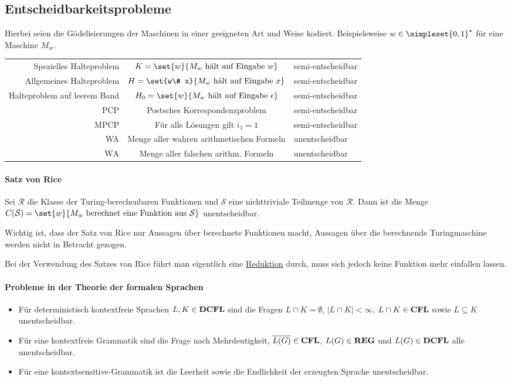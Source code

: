 \subsection{Entscheidbarkeitsprobleme}
Hierbei seien die Gödelisierungen der Maschinen in einer geeigneten Art und Weise kodiert. Beispielsweise $w\in\simpleset{0,1}^\star$ für eine Maschine $M_w$.
\medskip

\begin{tabular}{r|c|l}
	Spezielles Halteproblem & $K=\set{w}{M_w \text{ hält auf Eingabe } w}$ & semi-entscheidbar\\
	Allgemeines Halteproblem & $H=\set{w\# x}{M_w \text{ hält auf Eingabe } x}$ & semi-entscheidbar\\
	Halteproblem auf leerem Band & $H_0=\set{w}{M_w \text{ hält auf Eingabe } \epsilon}$ & semi-entscheidbar\\
	PCP & Postsches Korrespondenzproblem & semi-entscheidbar\\
	MPCP & Für alle Lösungen gilt $i_1=1$ & semi-entscheidbar\\
	WA & Menge aller wahren arithmetischen Formeln & unentscheidbar\\
	$\overline{\text{WA}}$ & Menge aller falschen arithm. Formeln & unentscheidbar
\end{tabular}

\paragraph{Satz von Rice}
Sei $\mathcal R$ die Klasse der Turing-berechenbaren Funktionen und $\mathcal S$ eine nichttriviale Teilmenge von $\mathcal R$.
Dann ist die Menge $C(\mathcal S)=\set{w}{M_w \text{ berechnet eine Funktion aus } \mathcal S}$ unentscheidbar.

Wichtig ist, dass der Satz von Rice nur Aussagen über berechnete Funktionen macht, Aussagen über die berechnende Turingmaschine werden nicht in Betracht gezogen.

Bei der Verwendung des Satzes von Rice führt man eigentlich eine \hyperref[sec:reduktion]{Reduktion} durch, muss sich jedoch keine Funktion mehr einfallen lassen.

\paragraph{Probleme in der Theorie der formalen Sprachen}
\begin{itemize}
	\item Für deterministisch kontextfreie Sprachen $L,K\in\operatorname{\mathbf{DCFL}}$ sind die Fragen $L\cap K=\emptyset$, $|L\cap K|<\infty$, $L\cap K \in \operatorname{\mathbf{CFL}}$ sowie $L\subseteq K$ unentscheidbar.
	\item Für eine kontextfreie Grammatik sind die Frage nach Mehrdeutigkeit, $\overline{L(G)}\in\operatorname{\mathbf{CFL}}$, $L(G)\in \operatorname{\mathbf{REG}}$ und $L(G)\in \operatorname{\mathbf{DCFL}}$ alle unentscheidbar.
	\item Für eine kontextsensitive-Grammatik ist die Leerheit sowie die Endlichkeit der erzeugten Sprache unentscheidbar.
\end{itemize}

